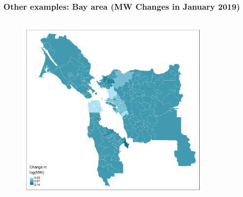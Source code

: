 \documentclass[aspectratio=169, t]{beamer}
\begin{document}
\begin{frame}[label = nyc_example]
\begin{columns}
\begin{column}{0.50\textwidth}
\begin{figure}
            \end{figure}   
        \end{column}
    \end{columns}
    \hyperlink{chi_example}{}
\end{frame}

\begin{frame}[label = bay_example]
\frametitle{Other examples: Bay area (MW Changes in January 2019)}
    \begin{columns}
        \begin{column}{0.50\textwidth}
            \vspace{-4mm}
            \begin{figure}
                \centering
                \includegraphics[scale = 0.36]{maps_events/output/bay_area_2018-12_actual_mw.png}
            \end{figure}   
        \end{column}
        \begin{column}{0.50\textwidth}
            \vspace{-4mm}
            \begin{figure}
                \centering

\end{figure}
\end{column}
\end{columns}
\end{frame}
\end{document}

